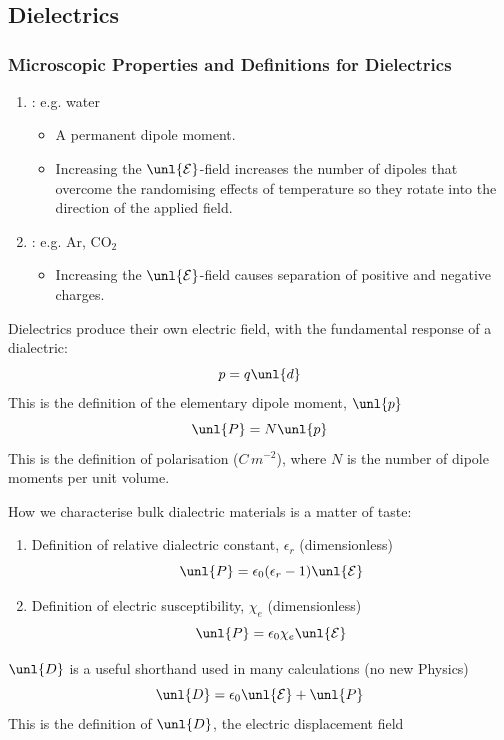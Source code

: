 \documentclass[a4paper, 11pt, normalem]{report}
\renewcommand\E{\mathcal{E}}
\newcommand\uE{\unl{\E}}
\newcommand\eno{\epsilon_0}
\newcommand\er{\epsilon_r}
\begin{document}
\chapter{}
\section{Dielectrics}
\subsection{Microscopic Properties and Definitions for Dielectrics}
\begin{enumerate}
    \item {}: e.g. water
    \begin{itemize}
        \item A permanent dipole moment.
        \item Increasing the $\uE$-field increases the number of dipoles that overcome the randomising effects of temperature so they rotate into the direction of the applied field.
    \end{itemize}
    \item {}: e.g. Ar, CO$_2$
    \begin{itemize}
        \item Increasing the $\uE$-field causes separation of positive and negative charges.
    \end{itemize}
\end{enumerate}
Dielectrics produce their own electric field, with the fundamental response of a dialectric:
\begin{equation}
    p = q\unl{d}
\end{equation}
This is the definition of the elementary dipole moment, $\unl{p}$
\begin{equation}
    \unl{P} = N\unl{p}
\end{equation}
This is the definition of polarisation ($C\,m^{-2}$), where $N$ is the number of dipole moments per unit volume.

How we characterise bulk dialectric materials is a matter of taste:
\begin{enumerate}
    \item Definition of relative dialectric constant, $\er$ (dimensionless)
    \begin{equation}
        \unl{P} = \eno(\er - 1)\uE
    \end{equation}
    \item Definition of electric susceptibility, $\chi_e$ (dimensionless)
    \begin{equation}
        \unl{P} = \eno\chi_e\uE
    \end{equation}
\end{enumerate}
$\unl{D}$ is a useful shorthand used in many calculations (no new Physics)
\begin{equation}
    \unl{D} = \eno\uE + \unl{P}
\end{equation}
This is the definition of $\unl{D}$, the electric displacement field
\end{document}
